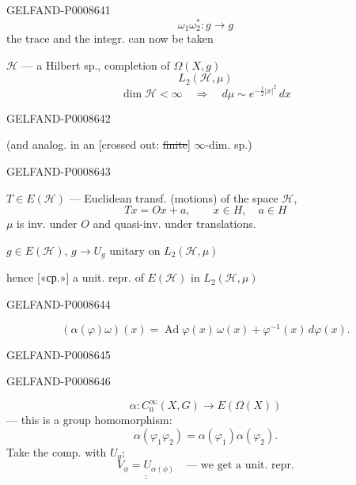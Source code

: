 \begin{GelfandAdjacentEvidence}{GELFAND-P000864}{1}
\[
\omega_1\omega_2^*:g\longrightarrow g
\]
the trace and the integr. can now be taken

\(\mathcal H\) — a Hilbert sp., completion of \(\Omega(X,g)\)
\[
L_2(\mathcal H,\mu)
\]
\[
\dim\mathcal H<\infty\quad\Rightarrow\quad d\mu\sim e^{-\frac12|x|^2}\,dx
\]
\end{GelfandAdjacentEvidence}
\begin{GelfandAdjacentEvidence}{GELFAND-P000864}{2}

(and analog. in an [crossed out: \sout{finite}] \(\infty\)-dim. sp.)
\end{GelfandAdjacentEvidence}
\begin{GelfandAdjacentEvidence}{GELFAND-P000864}{3}


\(T\in E(\mathcal H)\) — Euclidean transf. (motions) of the space \(\mathcal H\),
\[
Tx=Ox+a,\qquad x\in H,\quad a\in H
\]
\(\mu\) is inv. under \(O\) and quasi-inv. under translations.

\(g\in E(\mathcal H)\), \(g\to U_g\) unitary on \(L_2(\mathcal H,\mu)\)

hence [«ср.»] a unit. repr. of \(E(\mathcal H)\) in \(L_2(\mathcal H,\mu)\)
\end{GelfandAdjacentEvidence}
\begin{GelfandAdjacentEvidence}{GELFAND-P000864}{4}

\[
(\alpha(\varphi)\omega)(x)=\operatorname{Ad}\varphi(x)\,\omega(x)
+\varphi^{-1}(x)\,d\varphi(x).\tag{2}
\]
\end{GelfandAdjacentEvidence}
\begin{GelfandAdjacentEvidence}{GELFAND-P000864}{5}

\end{GelfandAdjacentEvidence}
\begin{GelfandAdjacentEvidence}{GELFAND-P000864}{6}

\[
\alpha:C_0^\infty(X,G)\longrightarrow E(\Omega(X))
\]
— this is a group homomorphism:
\[
\alpha(\varphi_1\varphi_2)=\alpha(\varphi_1)\alpha(\varphi_2).
\]
Take the comp. with \(U_g\);
\[
\underline{\underline{V_\phi=U_{\alpha(\phi)}}}
\quad\text{— we get a unit. repr.}
\]
\end{GelfandAdjacentEvidence}

